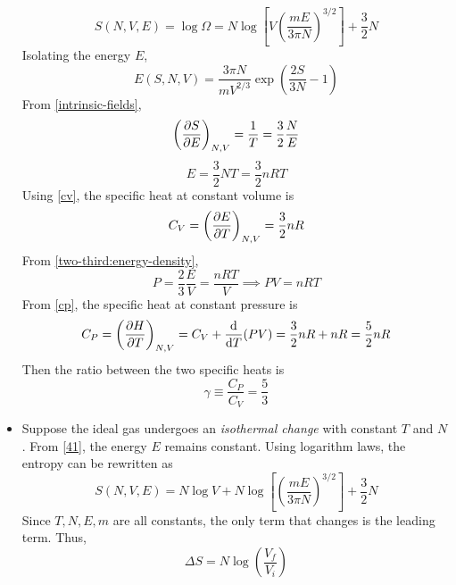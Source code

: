 \documentclass{article}
\begin{document}
\begin{itemize}
\begin{derivation}
\begin{equation}
            S(N,V,E)=\log\Omega=N\log\left[V\left(\frac{mE}{3\pi N}\right)^{3/2}\right]+\frac{3}{2}N\label{wrong:entropy}
        \end{equation}
        Isolating the energy $E$,
        \begin{equation}
            E(S,N,V)=\frac{3\pi N}{mV^{2/3}}\exp(\frac{2S}{3N}-1)
        \end{equation}
        From \eqref{intrinsic-fields}, 
        \begin{equation}
            \left(\partialderivative{S}{E}\right)_{N,V}=\frac{1}{T}=\frac{3}{2}\frac{N}{E}
        \end{equation}
        \begin{equation}
            E=\frac{3}{2}NT=\frac{3}{2}nRT\label{41}
        \end{equation}
        Using \eqref{cv}, the specific heat at constant volume is
        \begin{equation}
            C_V=\left(\partialderivative{E}{T}\right)_{N,V}=\frac{3}{2}nR\label{ideal-gas:cv}
        \end{equation}
        From \eqref{two-third:energy-density}, 
        \begin{equation}
            P=\frac{2}{3}\frac{E}{V}=\frac{nRT}{V}\implies PV=nRT
        \end{equation}
        From \eqref{cp}, the specific heat at constant pressure is
        \begin{equation}
            C_P=\left(\partialderivative{H}{T}\right)_{N,V}=C_V+\frac{\dd}{\dd T}(PV)=\frac{3}{2}nR+nR=\frac{5}{2}nR\label{ideak-gas:cp}
        \end{equation}
        Then the ratio between the two specific heats is
        \begin{equation}
            \gamma\equiv\frac{C_P}{C_V}=\frac{5}{3}
        \end{equation}
    \end{derivation}
    \item Suppose the ideal gas undergoes an \textit{isothermal change} with constant $T$ and $N$. From \eqref{41}, the energy $E$ remains constant. Using logarithm laws, the entropy can be rewritten as
    \begin{equation}
        S(N,V,E)=N\log V+N\log\left[\left(\frac{mE}{3\pi N}\right)^{3/2}\right]+\frac{3}{2}N
    \end{equation}
    Since $T,N,E,m$ are all constants, the only term that changes is the leading term. Thus,
    \begin{equation}
        \Delta S=N\log\left(\frac{V_f}{V_i}\right)
    \end{equation}
\end{itemize}
\end{document}
